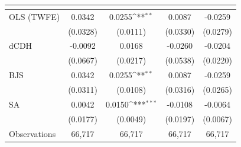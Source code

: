 {
\def\sym#1{\ifmmode^{#1}\else\(^{#1}\)\fi}
\begin{tabular}{l*{4}{c}}
\toprule
            &&&&\\
\midrule
OLS (TWFE) & 0.0342 & 0.0255\sym{**} & 0.0087 & -0.0259 \\
             & (0.0328) & (0.0111) & (0.0330) & (0.0279) \\
dCDH & -0.0092 & 0.0168 & -0.0260 & -0.0204 \\
             & (0.0667) & (0.0217) & (0.0538) & (0.0220) \\
BJS & 0.0342 & 0.0255\sym{**} & 0.0087 & -0.0259 \\
             & (0.0311) & (0.0108) & (0.0316) & (0.0265) \\
SA & 0.0042 & 0.0150\sym{***} & -0.0108 & -0.0064 \\
             & (0.0177) & (0.0049) & (0.0197) & (0.0067) \\
\midrule
Observations & 66,717 & 66,717 & 66,717 & 66,717 \\
\bottomrule
\end{tabular}
}
